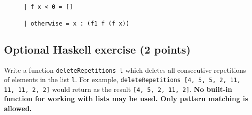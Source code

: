 \documentclass [11pt, a4wide, twoside]{article}
\begin{document}
	~~~~~ \texttt{| f x < 0 = []}
	
    	~~~~~ \texttt{| otherwise = x : (f1 f (f x))}


\newpage
\solution{}

\subsection*{Optional Haskell exercise (2 points)}

Write a function \texttt{deleteRepetitions l} which deletes all consecutive repetitions of elements in the list \texttt{l}.
For example, \texttt{deleteRepetitions [4, 5, 5, 2, 11, 11, 11, 2, 2]} would return as the result \texttt{[4, 5, 2, 11, 2]}.
\textbf{No built-in function for working with lists may be used. Only pattern matching is allowed.}

\vspace{0.2cm}
\end{document}
